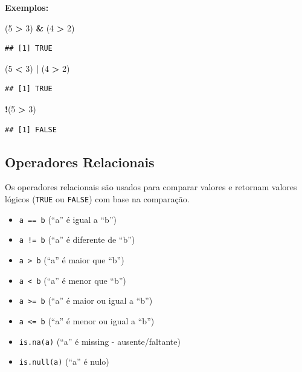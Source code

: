 \documentclass[
]{book}
\newenvironment{Shaded}{\begin{snugshade}}{\end{snugshade}}
\newcommand{\DecValTok}[1]{\textcolor[rgb]{0.00,0.00,0.81}{#1}}
\newcommand{\NormalTok}[1]{#1}
\newcommand{\SpecialCharTok}[1]{\textcolor[rgb]{0.81,0.36,0.00}{\textbf{#1}}}
\providecommand{\tightlist}{%
  \setlength{\itemsep}{0pt}\setlength{\parskip}{0pt}}
\begin{document}
\textbf{Exemplos:}

\begin{Shaded}
\begin{Highlighting}[]
\NormalTok{(}\DecValTok{5} \SpecialCharTok{\textgreater{}} \DecValTok{3}\NormalTok{) }\SpecialCharTok{\&}\NormalTok{ (}\DecValTok{4} \SpecialCharTok{\textgreater{}} \DecValTok{2}\NormalTok{) }
\end{Highlighting}
\end{Shaded}

\begin{verbatim}
## [1] TRUE
\end{verbatim}

\begin{Shaded}
\begin{Highlighting}[]
\NormalTok{(}\DecValTok{5} \SpecialCharTok{\textless{}} \DecValTok{3}\NormalTok{) }\SpecialCharTok{|}\NormalTok{ (}\DecValTok{4} \SpecialCharTok{\textgreater{}} \DecValTok{2}\NormalTok{) }
\end{Highlighting}
\end{Shaded}

\begin{verbatim}
## [1] TRUE
\end{verbatim}

\begin{Shaded}
\begin{Highlighting}[]
\SpecialCharTok{!}\NormalTok{(}\DecValTok{5} \SpecialCharTok{\textgreater{}} \DecValTok{3}\NormalTok{)  }
\end{Highlighting}
\end{Shaded}

\begin{verbatim}
## [1] FALSE
\end{verbatim}

\subsection{Operadores Relacionais}\label{operadores-relacionais}

Os operadores relacionais são usados para comparar valores e retornam valores lógicos (\texttt{TRUE} ou \texttt{FALSE}) com base na comparação.

\begin{itemize}
\tightlist
\item
  \texttt{a\ ==\ b} (``a'' é igual a ``b'')
\item
  \texttt{a\ !=\ b} (``a'' é diferente de ``b'')
\item
  \texttt{a\ \textgreater{}\ b} (``a'' é maior que ``b'')
\item
  \texttt{a\ \textless{}\ b} (``a'' é menor que ``b'')
\item
  \texttt{a\ \textgreater{}=\ b} (``a'' é maior ou igual a ``b'')
\item
  \texttt{a\ \textless{}=\ b} (``a'' é menor ou igual a ``b'')
\item
  \texttt{is.na(a)} (``a'' é missing - ausente/faltante)
\item
  \texttt{is.null(a)} (``a'' é nulo)
\end{itemize}
\end{document}
